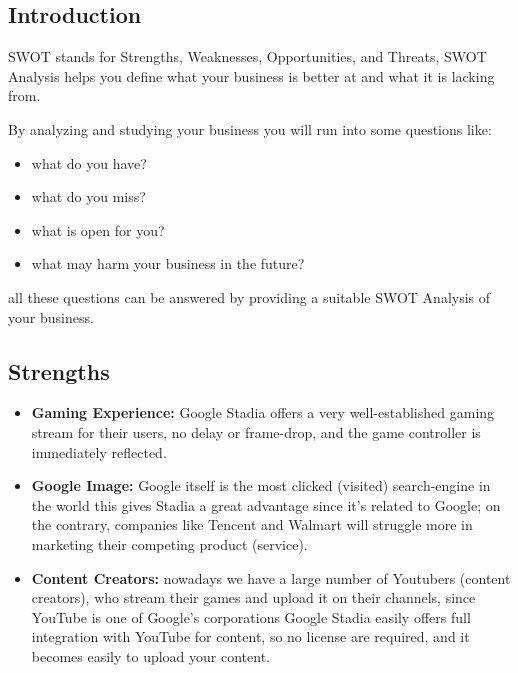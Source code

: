 \subsection{Introduction}

SWOT stands for Strengths, Weaknesses, Opportunities, and Threats, SWOT Analysis helps you define
what your business is better at and what it is lacking from.

By analyzing and studying your business you will run into some questions like:
{
\renewcommand\labelitemi{}
\begin{itemize}
    \item what do you have?
    \item what do you miss?
    \item what is open for you?
    \item what may harm your business in the future?
\end{itemize}
}
all these questions can be answered by providing a suitable SWOT Analysis of your business.



\subsection{Strengths}
    \begin{itemize}
        \item \textbf{Gaming Experience:}
            Google Stadia offers a very well-established gaming stream for 
            their users, no delay or frame-drop, and the game controller is immediately reflected.
        \item \textbf{Google Image:}
            Google itself is the most clicked (visited) search-engine in the world
            this gives Stadia a great advantage since it's related to Google; on the contrary, companies
            like Tencent and Walmart will struggle more in marketing their competing product (service).
        \item \textbf{Content Creators:} 
            nowadays we have a large number of Youtubers (content creators), who stream their games and 
            upload it on their channels, since YouTube is one of Google's corporations Google Stadia
            easily offers full integration with YouTube for content, so no license are required, and 
            it becomes easily to upload your content.
    \end{itemize}

